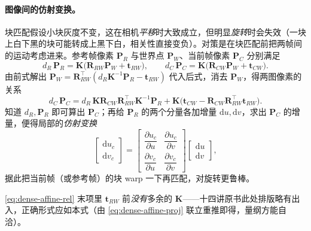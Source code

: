 \paragraph{图像间的仿射变换。}
块匹配假设小块灰度不变，这在相机\emph{平移}时大致成立，但明显\emph{旋转}时会失效（一块上白下黑的块可能转成上黑下白，相关性直接变负）。对策是在块匹配前把两帧间的运动考虑进来。参考帧像素 $\mathbf{P}_R$ 与世界点 $\mathbf{P}_W$、当前帧像素 $\mathbf{P}_C$ 分别满足
\begin{equation}
  d_R\,\mathbf{P}_R=\mathbf{K}\bigl(\mathbf{R}_{RW}\mathbf{P}_W+\mathbf{t}_{RW}\bigr),\qquad
  d_C\,\mathbf{P}_C=\mathbf{K}\bigl(\mathbf{R}_{CW}\mathbf{P}_W+\mathbf{t}_{CW}\bigr).
  \label{eq:dense-affine-proj}
\end{equation}
由前式解出 $\mathbf{P}_W=\mathbf{R}_{RW}^\top(d_R\mathbf{K}^{-1}\mathbf{P}_R-\mathbf{t}_{RW})$ 代入后式，消去 $\mathbf{P}_W$，得两图像素的关系
\begin{equation}
  d_C\,\mathbf{P}_C=d_R\,\mathbf{K}\mathbf{R}_{CW}\mathbf{R}_{RW}^\top\mathbf{K}^{-1}\mathbf{P}_R
   +\mathbf{K}\bigl(\mathbf{t}_{CW}-\mathbf{R}_{CW}\mathbf{R}_{RW}^\top\mathbf{t}_{RW}\bigr).
  \label{eq:dense-affine-rel}
\end{equation}
知道 $d_R,\mathbf{P}_R$ 即可算出 $\mathbf{P}_C$；再给 $\mathbf{P}_R$ 的两个分量各加增量 $\mathrm{d}u,\mathrm{d}v$，求出 $\mathbf{P}_C$ 的增量，便得局部的\emph{仿射变换}
\begin{equation}
  \begin{bmatrix}\mathrm{d}u_c\\\mathrm{d}v_c\end{bmatrix}
  =\begin{bmatrix}\dfrac{\partial u_c}{\partial u}&\dfrac{\partial u_c}{\partial v}\\[2mm]\dfrac{\partial v_c}{\partial u}&\dfrac{\partial v_c}{\partial v}\end{bmatrix}
   \begin{bmatrix}\mathrm{d}u\\\mathrm{d}v\end{bmatrix},
  \label{eq:dense-affine-mat}
\end{equation}
据此把当前帧（或参考帧）的块 warp 一下再匹配，对旋转更鲁棒。

\begin{note}
\cref{eq:dense-affine-rel} 末项里 $\mathbf{t}_{RW}$ 前\emph{没有}多余的 $\mathbf{K}$——十四讲原书此处排版略有出入，正确形式应如本式（由 \cref{eq:dense-affine-proj} 联立重推即得，量纲方能自洽）。
\end{note}

